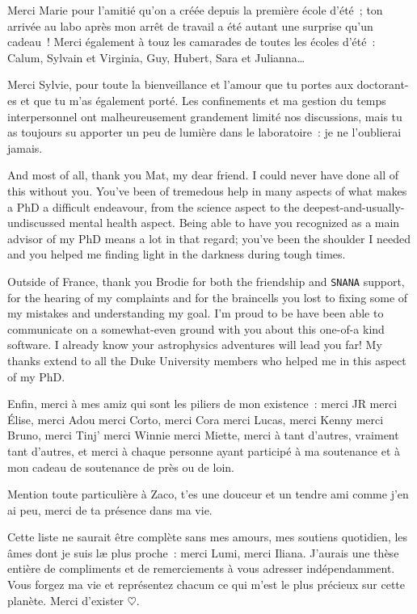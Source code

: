 \documentclass[../main/main.tex]{subfiles}
\begin{document}
Merci Marie pour l'amitié qu'on a créée depuis la première école d'été~; ton
arrivée au labo après mon arrêt de travail a été autant une surprise qu'un
cadeau~! Merci également à touz les camarades de toutes les écoles d'été~:
Calum, Sylvain et Virginia, Guy, Hubert, Sara et Julianna…

Merci Sylvie, pour toute la bienveillance et l'amour que tu portes aux
doctorant-es et que tu m'as également porté. Les confinements et ma gestion du
temps interpersonnel ont malheureusement grandement limité nos discussions, mais
tu as toujours su apporter un peu de lumière dans le laboratoire~: je ne
l'oublierai jamais.

And most of all, thank you Mat, my dear friend. I could never have done all of
this without you. You've been of tremedous help in many aspects of what makes a
PhD a difficult endeavour, from the science aspect to the
deepest-and-usually-undiscussed mental health aspect. Being able to have you
recognized as a main advisor of my PhD means a lot in that regard\string; you've
been the shoulder I needed and you helped me finding light in the darkness
during tough times.

Outside of France, thank you Brodie for both the friendship and \texttt{SNANA}
support, for the hearing of my complaints and for the braincells you lost to
fixing some of my mistakes and understanding my goal. I'm proud to be have been
able to communicate on a somewhat-even ground with you about this one-of-a kind
software. I already know your astrophysics adventures will lead you far! My
thanks extend to all the Duke University members who helped me in this aspect of
my PhD.

Enfin, merci à mes amiz qui sont les piliers de mon existence~: merci JR merci
Élise, merci Adou merci Corto, merci Cora merci Lucas, merci Kenny merci Bruno,
merci Tinj' merci Winnie merci Miette, merci à tant d'autres, vraiment tant
d'autres, et merci à chaque personne ayant participé à ma soutenance et à mon
cadeau de soutenance de près ou de loin.

Mention toute particulière à Zaco, t'es une douceur et un tendre ami comme j'en
ai peu, merci de ta présence dans ma vie.

\vfill

Cette liste ne saurait être complète sans mes amours, mes soutiens quotidien,
les âmes dont je suis læ plus proche~: merci Lumi, merci Iliana. J'aurais une
thèse entière de compliments et de remerciements à vous adresser indépendamment.
Vous forgez ma vie et représentez chacum ce qui m'est le plus précieux sur cette
planète. Merci d'exister $\heartsuit$.

\vfill
\end{document}
